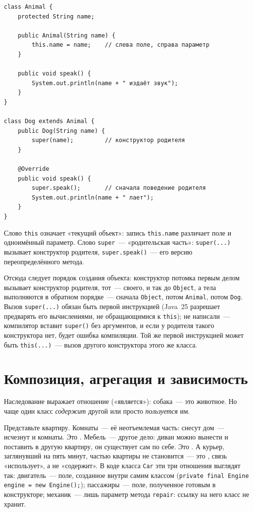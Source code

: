 \begin{listing}[H]
\begin{verbatim}
class Animal {
    protected String name;

    public Animal(String name) {
        this.name = name;    // слева поле, справа параметр
    }

    public void speak() {
        System.out.println(name + " издаёт звук");
    }
}

class Dog extends Animal {
    public Dog(String name) {
        super(name);         // конструктор родителя
    }

    @Override
    public void speak() {
        super.speak();       // сначала поведение родителя
        System.out.println(name + " лает");
    }
}
\end{verbatim}
\caption{Родительский класс и его потомок}
\label{lst:03-6}
\end{listing}

Слово \texttt{this} означает «текущий объект»: запись \texttt{this.name}
различает поле и одноимённый параметр. Слово \texttt{super}~--- «родительская
часть»: \texttt{super(...)} вызывает конструктор родителя,
\texttt{super.speak()}~--- его версию переопределённого метода.

Отсюда следует порядок создания объекта: конструктор потомка первым делом
вызывает конструктор родителя, тот~--- своего, и так до \texttt{Object}, а тела
выполняются в обратном порядке~--- сначала \texttt{Object}, потом
\texttt{Animal}, потом \texttt{Dog}. Вызов \texttt{super(...)} обязан быть
первой инструкцией (Java~25 разрешает предварять его вычислениями, не
обращающимися к \texttt{this}); не написали~--- компилятор вставит
\texttt{super()} без аргументов, и если у родителя такого конструктора нет,
будет ошибка компиляции.
Той же первой инструкцией может быть \texttt{this(...)}~--- вызов другого
конструктора этого же класса.

\section{Композиция, агрегация и зависимость}

Наследование выражает отношение  («является»): собака~--- это
животное. Но чаще один класс \emph{содержит} другой или просто
\emph{пользуется} им.

Представьте квартиру. Комнаты~--- её неотъемлемая часть: снесут дом~--- исчезнут
и комнаты. Это . Мебель~--- другое дело: диван можно вынести и
поставить в другую квартиру, он существует сам по себе. Это . А
курьер, заглянувший на пять минут, частью квартиры не становится~--- это
, связь «использует», а не «содержит». В коде класса
\texttt{Car} эти три отношения выглядят так: двигатель~--- поле, созданное
внутри самим классом (\texttt{private final Engine engine = new Engine();});
пассажиры~--- поле, полученное готовым в конструкторе; механик~--- лишь
параметр метода \texttt{repair}: ссылку на него класс не хранит.

